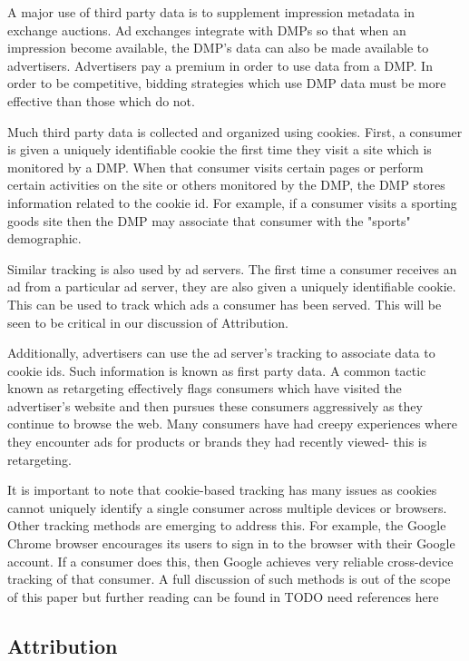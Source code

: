 \documentclass{article}
\begin{document}
A major use of third party data is to supplement impression metadata in exchange auctions. Ad exchanges integrate with DMPs so that when an impression become available, the DMP's data can also be made available to advertisers. Advertisers pay a premium in order to use data from a DMP. In order to be competitive, bidding strategies which use DMP data must be more effective than those which do not.

Much third party data is collected and organized using cookies. First, a consumer is given a uniquely identifiable cookie the first time they visit a site which is monitored by a DMP. When that consumer visits certain pages or perform certain activities on the site or others monitored by the DMP, the DMP stores information related to the cookie id. For example, if a consumer visits a sporting goods site then the DMP may associate that consumer with the "sports" demographic.

Similar tracking is also used by ad servers. The first time a consumer receives an ad from a particular ad server, they are also given a uniquely identifiable cookie. This can be used to track which ads a consumer has been served. This will be seen to be critical in our discussion of Attribution.

Additionally, advertisers can use the ad server's tracking to associate data to cookie ids. Such information is known as first party data. A common tactic known as retargeting effectively flags consumers which have visited the advertiser's website and then pursues these consumers aggressively as they continue to browse the web. Many consumers have had creepy experiences where they encounter ads for products or brands they had recently viewed- this is retargeting.

It is important to note that cookie-based tracking has many issues as cookies cannot uniquely identify a single consumer across multiple devices or browsers. Other tracking methods are emerging to address this. For example, the Google Chrome browser encourages its users to sign in to the browser with their Google account. If a consumer does this, then Google achieves very reliable cross-device tracking of that consumer. A full discussion of such methods is out of the scope of this paper but further reading can be found in TODO need references here

\subsection{Attribution}
\end{document}
